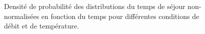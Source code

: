 \begin{figure}[h]
  \centering
  \hfill
  
  \caption{\label{fig:residence_time_distribution_raw}Densité de probabilité des distributions du temps de séjour non-normalisées en fonction du temps pour différentes conditions de débit et de température.}
\end{figure}

